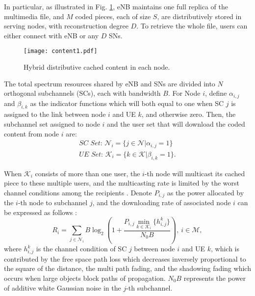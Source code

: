 \documentclass[journal,12pt,onecolumn]{IEEEtran}
\begin{document}
In particular, as illustrated in Fig. \ref{CONTENT}, eNB maintains one full replica of the multimedia file, and $M$ coded pieces, each of size $S$, are distributively stored in serving nodes, with reconstruction degree $D$. To retrieve the whole file, users can either connect with eNB or any $D$ SNs. 

\begin{figure}[t]
\centering
\texttt{[image: content1.pdf]}\caption{Hybrid distributive cached content in each node.}
\label{CONTENT}
\vspace{-1em}
\end{figure}

The total spectrum resources shared by eNB and SNs are divided into $N$ orthogonal subchannels (SCs), each with bandwidth $B$. For Node $i$, define ${\alpha_{i,j}}$ and ${\beta_{i,k}}$ as the indicator functions which will both equal to one when SC $j$ is assigned to the link between node $i$ and UE $k$, and otherwise zero. Then, the subchannel set assigned to node $i$ and the user set that will download the coded content from node $i$ are:
\begin{equation}
\begin{array}{l}
\textit{SC Set: }\mathcal{N}_i=\{j\in\mathcal{N}|\alpha_{i,j}= 1\}\\
\textit{UE Set: }\mathcal{K}_i=\{k\in\mathcal{K}|\beta_{i,k}= 1\}.
\end{array}
\end{equation}

When $\mathcal{K}_i$ consists of more than one user, the $i$-th node will multicast its cached piece to these multiple users, and the multicasting rate is limited by the worst channel conditions among the recipients \cite{6516553}. Denote $P_{i,j}$ as the power allocated by the $i$-th node to subchannel $j$, and the downloading rate of associated node $i$ can be expressed as follows \cite{4432239}:
\begin{equation}
\label{eq1}
R_i=\sum\limits_{j\in\mathcal{N}_i} B\log_2( 1 + \frac{P_{i,j}\min\limits_{k\in\mathcal{K}_i}\{h_{i,j}^k\}}{N_0 B}),\: i\in\mathcal{M},
\end{equation}
where $h_{i,j}^k$ is the channel condition of SC $j$ between node $i$ and UE $k$, which is contributed by the free space path loss which decreases inversely proportional to the square of the distance, the multi path fading, and the shadowing fading which occurs when large objects block paths of propagation. ${N_0}B$ represents the power of additive white Gaussian noise in the $j$-th subchannel.
\end{document}
